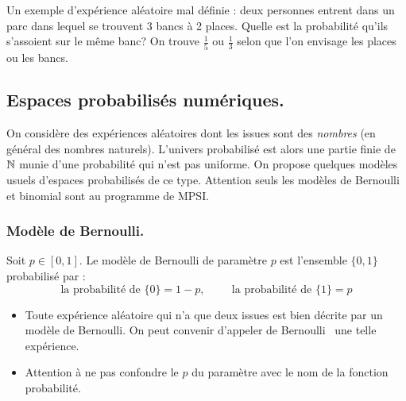 \clearpage
Un exemple d'expérience aléatoire mal définie : deux personnes entrent dans un parc dans lequel se trouvent  3 bancs à 2 places. Quelle est la probabilité qu'ils s'assoient sur le même banc? On trouve $\frac{1}{5}$ ou $\frac{1}{3}$ selon que l'on envisage les places ou les bancs.
\clearpage

\subsection{Espaces probabilisés numériques.}
On considère des expériences aléatoires dont les issues sont des \emph{nombres} (en général des nombres naturels). L'univers probabilisé est alors une partie finie de $\mathbb{N}$ munie d'une probabilité qui n'est pas uniforme. On propose quelques modèles usuels d'espaces probabilisés de ce type. Attention seuls les modèles de Bernoulli et binomial sont au programme de MPSI. 
\subsubsection{Modèle de Bernoulli.}
\begin{defi}
  Soit $p\in [0,1]$. Le modèle de Bernoulli de paramètre $p$ est l'ensemble $\{0,1\}$ probabilisé par :
  \begin{displaymath}
    \text{la probabilité de } \{0\} = 1-p,\hspace{1cm} \text{la probabilité de } \{1\} = p
  \end{displaymath}
\end{defi}
\begin{rems}
\begin{itemize}
  \item Toute expérience aléatoire qui n'a que deux issues est bien décrite par un modèle de Bernoulli. On peut convenir d'appeler  \og de Bernoulli\fg~ une telle expérience.
  \item Attention à ne pas confondre le $p$ du paramètre avec le nom de la fonction probabilité.
\end{itemize}
\end{rems}

